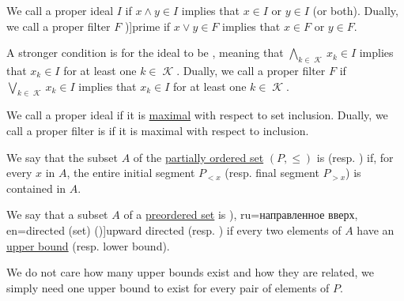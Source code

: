 \begin{definition}
\begin{thmenum}
    \begin{TwoColumns*}
      We call a proper ideal \( I \)  if \( {x \wedge y \in I} \) implies that \( {x \in I} \) or \( {y \in I} \) (or both).
    \BeginSecondColumn
      Dually, we call a proper filter \( F \) \term[ru=простой (фильтр) (\cite[183]{Гуров2013})]{prime} if \( {x \vee y \in F} \) implies that \( {x \in F} \) or \( {y \in F} \).
    \end{TwoColumns*}

    \begin{TwoColumns*}
      A stronger condition is for the ideal to be , meaning that \( \bigwedge_{k \in \mscrK} x_k \in I \) implies that \( x_k \in I \) for at least one \( k \in \mscrK \).
    \BeginSecondColumn
      Dually, we call a proper filter \( F \)  if \( \bigvee_{k \in \mscrK} x_k \in I \) implies that \( x_k \in I \) for at least one \( k \in \mscrK \).
    \end{TwoColumns*}

    \begin{TwoColumns*}
      We call a proper ideal  if it is \hyperref[def:extremal_points/maximal_and_minimal_element]{maximal} with respect to set inclusion.
    \BeginSecondColumn
      Dually, we call a proper filter is  if it is maximal with respect to inclusion.
    \end{TwoColumns*}
  \end{thmenum}
\end{definition}

\begin{definition}\label{def:closed_ordered_subset}
  We say that the subset \( A \) of the \hyperref[def:partially_ordered_set]{partially ordered set} \( (P, \leq) \) is  (resp. ) if, for every \( x \) in \( A \), the entire initial segment \( P_{<x} \) (resp. final segment \( P_{>x} \)) is contained in \( A \).
\end{definition}

\begin{definition}\label{def:directed_set}
  We say that a subset \( A \) of a \hyperref[def:preordered_set]{preordered set} is \term[bg=насочено надясно (множество) (\cite[10]{Проданов1982}), ru=направленное вверх, en=directed (set) (\cite[332]{PicadoPultr2012})]{upward directed} (resp. ) if every two elements of \( A \) have an \hyperref[def:extremal_points/bounds]{upper bound} (resp. lower bound).
\end{definition}
\begin{comments}
  \item We do not care how many upper bounds exist and how they are related, we simply need one upper bound to exist for every pair of elements of \( P \).
\end{comments}

